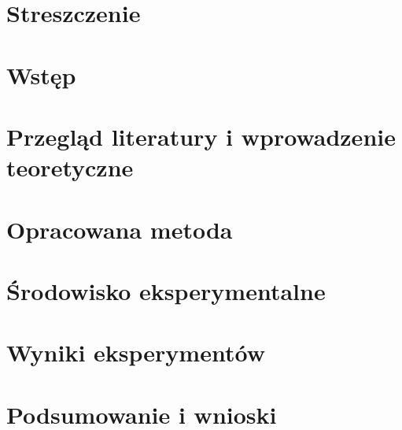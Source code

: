 \documentclass[a4paper,12pt,polish,twoside]{extreport}
\begin{document}
 {

    
    \null\newpage

    \tableofcontents

    \chapter*{Streszczenie}
    \label{chapter0:streszczenie} {
        
    }

    \chapter{Wstęp}
    \label{chapter1:wstep} {
        
    }

    \chapter{Przegląd literatury i wprowadzenie teoretyczne}
    \label{chapter2:przeglad_literatury} {
        
    }

    \chapter{Opracowana metoda}
    \label{chapter3:metoda} {
        
    }

    \chapter{Środowisko eksperymentalne}
    \label{chapter4:srodowisko_eksperymentalne} {
        
    }

    \chapter{Wyniki eksperymentów}
    \label{chapter5:eksperymenty} {
        
    }

    \chapter{Podsumowanie i wnioski}
    \label{chapter6:podsumowanie} {
        
    }

    \newpage
    \listoffigures

    \newpage
    \listofcodes

    \newpage
    \renewcommand{\listtablename}{Spis tabel}
    \listoftables

    \newpage
    \printbibliography[heading=bibintoc,title={Bibliografia}]
}
\end{document}

